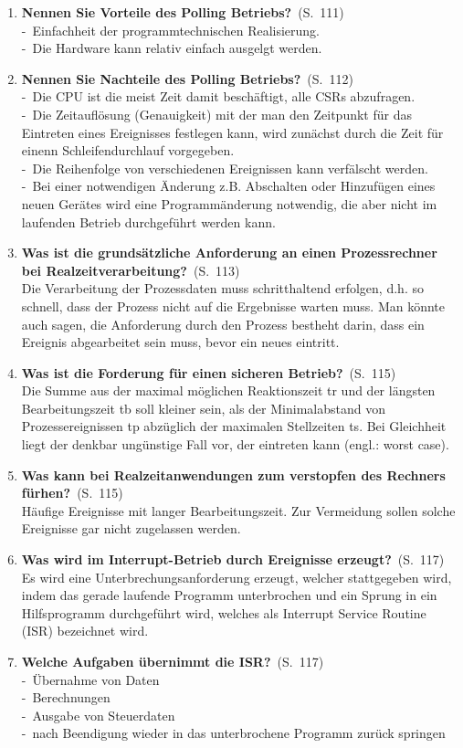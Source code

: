 \documentclass[a4paper,12pt]{article}
\newcommand{\question}[3]{\pagebreak[3]\item {\textbf{#1?}}\ (S.\ #2)#3}
\newcommand{\catchword}[1]{\\-\ #1}
\newcommand{\normaltext}[1]{\\#1}
\newcommand{\page}[1]{#1}
\begin{document}
\begin{enumerate}
  \question{Nennen Sie Vorteile des Polling Betriebs}{\page{111}}
  {
    \catchword{Einfachheit der programmtechnischen Realisierung.}
    \catchword{Die Hardware kann relativ einfach ausgelgt werden.}
  }

  \question{Nennen Sie Nachteile des Polling Betriebs}{\page{112}}
  {
    \catchword{Die CPU ist die meist Zeit damit beschäftigt, alle CSRs abzufragen.}
    \catchword{Die Zeitauflösung (Genauigkeit) mit der man den Zeitpunkt für das Eintreten
               eines Ereignisses festlegen kann, wird zunächst durch die Zeit für einenn Schleifendurchlauf
               vorgegeben.}
    \catchword{Die Reihenfolge von verschiedenen Ereignissen kann verfälscht werden.}
    \catchword{Bei einer notwendigen Änderung z.B. Abschalten oder Hinzufügen eines neuen
               Gerätes wird eine Programmänderung notwendig, die aber nicht im laufenden Betrieb 
               durchgeführt werden kann.}
  }

  \question{Was ist die grundsätzliche Anforderung an einen Prozessrechner bei
            Realzeitverarbeitung}{\page{113}}
  {
    \normaltext{Die Verarbeitung der Prozessdaten muss schritthaltend erfolgen, d.h. so schnell,
    dass der Prozess nicht auf  die Ergebnisse warten muss. Man könnte auch sagen, die Anforderung
    durch den Prozess bestheht darin, dass ein Ereignis abgearbeitet sein muss, bevor ein neues eintritt.}
  }

  \question{Was ist die Forderung für einen sicheren Betrieb}{\page{115}}
  {
    \normaltext{Die Summe aus der maximal möglichen Reaktionszeit tr und der längsten Bearbeitungszeit tb
    soll kleiner sein, als der Minimalabstand von Prozessereignissen tp abzüglich der maximalen Stellzeiten ts.
    Bei Gleichheit liegt der denkbar ungünstige Fall vor, der eintreten kann (engl.: worst case).}
  }

  \question{Was kann bei Realzeitanwendungen zum verstopfen des Rechners fürhen}{\page{115}}
  {
    \normaltext{Häufige Ereignisse mit langer Bearbeitungszeit. Zur Vermeidung sollen solche Ereignisse gar 
    nicht zugelassen werden.}
  }


  \question{Was wird im Interrupt-Betrieb durch Ereignisse erzeugt}{\page{117}}
  {
    \normaltext{Es wird eine Unterbrechungsanforderung erzeugt, welcher stattgegeben wird, indem das gerade
    laufende Programm unterbrochen und ein Sprung in ein Hilfsprogramm durchgeführt wird, welches als Interrupt
    Service Routine (ISR) bezeichnet wird.}
  }

  \question{Welche Aufgaben übernimmt die ISR}{\page{117}}
  {
    \catchword{Übernahme von Daten}
    \catchword{Berechnungen}
    \catchword{Ausgabe von Steuerdaten}
    \catchword{nach Beendigung wieder in das unterbrochene Programm zurück springen}
  }


\end{enumerate}
\end{document}
